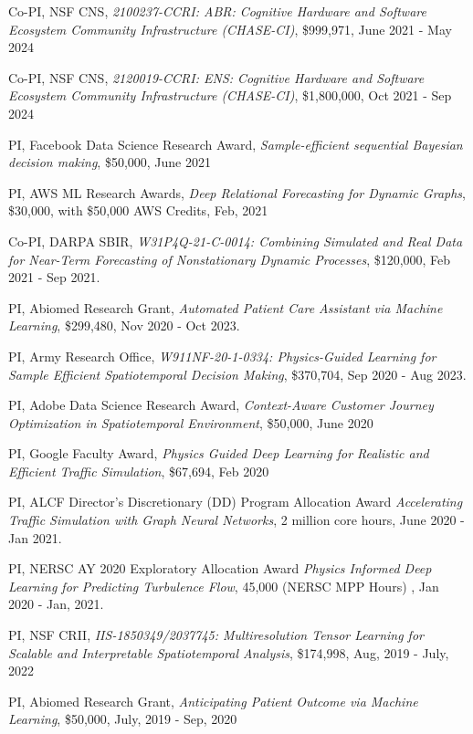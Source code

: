 \documentclass[margin,line]{res}
\begin{document}
\begin{resume}
\begin{enumerate}[label={[G\arabic*]}]
 \item Co-PI, NSF CNS, \textit{ 2100237-CCRI: ABR: Cognitive Hardware and Software Ecosystem Community Infrastructure (CHASE-CI)}, \$999,971,  June 2021 - May 2024
\item Co-PI, NSF CNS, \textit{2120019-CCRI: ENS: Cognitive Hardware and Software Ecosystem Community Infrastructure (CHASE-CI)}, \$1,800,000,  Oct 2021 - Sep 2024
\item PI, Facebook  Data Science  Research Award, \textit{Sample-efficient sequential Bayesian decision making}, \$50,000, June 2021
\item PI, AWS ML Research Awards, \textit{Deep Relational Forecasting for Dynamic Graphs}, \$30,000, with \$50,000 AWS Credits, Feb, 2021
\item Co-PI, DARPA SBIR, \textit{W31P4Q-21-C-0014: Combining Simulated and Real Data for Near-Term Forecasting of Nonstationary Dynamic Processes}, \$120,000, Feb 2021 - Sep 2021.
\item PI, {Abiomed Research Grant}, \textit{Automated Patient Care Assistant via Machine Learning}, \$299,480, Nov 2020 - Oct 2023.
\item PI,   Army Research Office,  \textit{W911NF-20-1-0334: Physics-Guided Learning for Sample Efficient Spatiotemporal Decision Making}, \$370,704, Sep 2020 - Aug 2023. 
\item PI, Adobe Data Science Research Award, \textit{Context-Aware Customer Journey Optimization in Spatiotemporal Environment}, \$50,000, June 2020
\item PI, Google Faculty Award,  \textit{Physics Guided Deep Learning for Realistic and Efficient Traffic Simulation}, \$67,694, Feb 2020
\item PI,  ALCF Director’s Discretionary (DD) Program Allocation Award \textit{Accelerating Traffic Simulation with Graph Neural Networks},  2 million core hours, June 2020 - Jan 2021.
\item PI,  NERSC AY 2020 Exploratory Allocation Award \textit{Physics Informed Deep Learning for Predicting Turbulence Flow}, 45,000  (NERSC MPP Hours) , Jan 2020 - Jan, 2021.
\item  PI, {NSF CRII},    \textit{IIS-1850349/2037745: Multiresolution Tensor Learning for Scalable and Interpretable Spatiotemporal Analysis},    \$174,998,  Aug, 2019 - July, 2022

\item PI, {Abiomed Research Grant},    \textit{Anticipating Patient Outcome via Machine Learning}, \$50,000, July, 2019 - Sep, 2020


\end{enumerate}
\end{resume}
\end{document}
